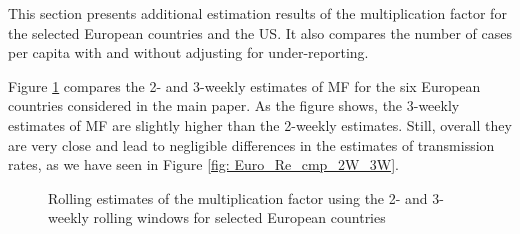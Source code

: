 \documentclass[12pt]{article}
\begin{document}
This section presents additional estimation results of the multiplication
factor for the selected European countries and the US. It also compares the
number of cases per capita with and without adjusting for under-reporting.

Figure \ref{fig: Euro_MF_cmp_2W_3W} compares the 2- and 3-weekly estimates of
MF for the six European countries considered in the main paper. As the figure
shows, the 3-weekly estimates of MF are slightly higher than the 2-weekly
estimates. Still, overall they are very close and lead to negligible
differences in the estimates of transmission rates, as we have seen in Figure
\ref{fig: Euro_Re_cmp_2W_3W}.%

\begin{figure}[tp]%
\caption
{Rolling estimates of the multiplication factor using the 2- and 3-weekly
rolling windows for selected European countries}%
\vspace{-0.2cm}%
\label{fig: Euro_MF_cmp_2W_3W}%

\begin{footnotesize}%



\end{footnotesize}
\end{figure}
\end{document}
